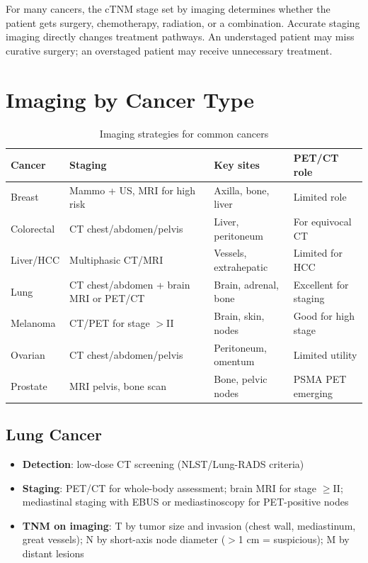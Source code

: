 \begin{pearlbox}
For many cancers, the cTNM stage set by imaging determines whether the patient gets surgery, chemotherapy, radiation, or a combination. Accurate staging imaging directly changes treatment pathways. An understaged patient may miss curative surgery; an overstaged patient may receive unnecessary treatment.
\end{pearlbox}

\section{Imaging by Cancer Type}

\begin{table}[h]
\centering
\caption{Imaging strategies for common cancers}
\begin{tabular}{|p{}|p{}|p{}|p{}|}
\hline
\textbf{Cancer} & \textbf{Staging} & \textbf{Key sites} & \textbf{PET/CT role} \\
\hline
Breast & Mammo + US, MRI for high risk & Axilla, bone, liver & Limited role \\
Colorectal & CT chest/abdomen/pelvis & Liver, peritoneum & For equivocal CT \\
Liver/HCC & Multiphasic CT/MRI & Vessels, extrahepatic & Limited for HCC \\
Lung & CT chest/abdomen + brain MRI or PET/CT & Brain, adrenal, bone & Excellent for staging \\
Melanoma & CT/PET for stage $>$II & Brain, skin, nodes & Good for high stage \\
Ovarian & CT chest/abdomen/pelvis & Peritoneum, omentum & Limited utility \\
Prostate & MRI pelvis, bone scan & Bone, pelvic nodes & PSMA PET emerging \\
\hline
\end{tabular}
\end{table}

\subsection{Lung Cancer}
\begin{itemize}
  \item \textbf{Detection}: low-dose CT screening (NLST/Lung-RADS criteria)
  \item \textbf{Staging}: PET/CT for whole-body assessment; brain MRI for stage $\geq$II; mediastinal staging with EBUS or mediastinoscopy for PET-positive nodes
  \item \textbf{TNM on imaging}: T by tumor size and invasion (chest wall, mediastinum, great vessels); N by short-axis node diameter ($>$1 cm = suspicious); M by distant lesions
\end{itemize}

